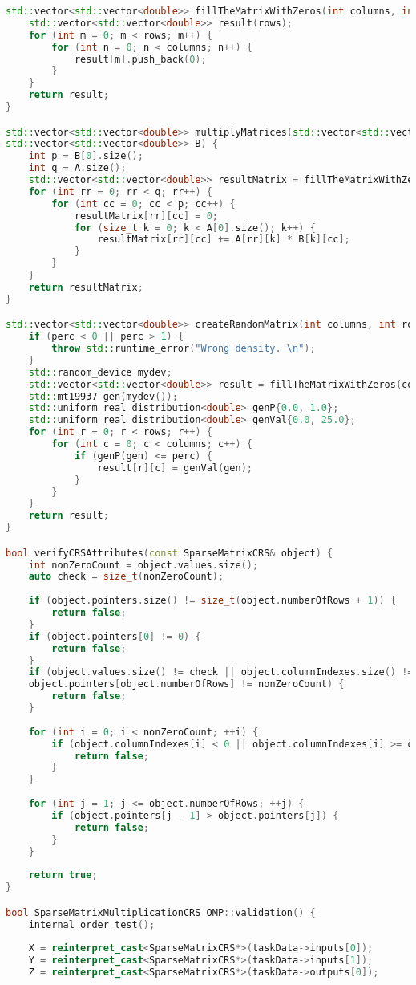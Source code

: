 \documentclass[a4paper, 14pt]{article}
\newcommand{\n}{\par}
\theoremstyle{plain}
\begin{document}
\begin{lstlisting}[language=C++,caption=Файл sparse\_matmult\_crs\_omp.cpp]
std::vector<std::vector<double>> fillTheMatrixWithZeros(int columns, int rows) {
	std::vector<std::vector<double>> result(rows);
	for (int m = 0; m < rows; m++) {
		for (int n = 0; n < columns; n++) {
			result[m].push_back(0);
		}
	}
	return result;
}

std::vector<std::vector<double>> multiplyMatrices(std::vector<std::vector<double>> A,
std::vector<std::vector<double>> B) {
	int p = B[0].size();
	int q = A.size();
	std::vector<std::vector<double>> resultMatrix = fillTheMatrixWithZeros(p, q);
	for (int rr = 0; rr < q; rr++) {
		for (int cc = 0; cc < p; cc++) {
			resultMatrix[rr][cc] = 0;
			for (size_t k = 0; k < A[0].size(); k++) {
				resultMatrix[rr][cc] += A[rr][k] * B[k][cc];
			}
		}
	}
	return resultMatrix;
}

std::vector<std::vector<double>> createRandomMatrix(int columns, int rows, double perc) {
	if (perc < 0 || perc > 1) {
		throw std::runtime_error("Wrong density. \n");
	}
	std::random_device mydev;
	std::vector<std::vector<double>> result = fillTheMatrixWithZeros(columns, rows);
	std::mt19937 gen(mydev());
	std::uniform_real_distribution<double> genP{0.0, 1.0};
	std::uniform_real_distribution<double> genVal{0.0, 25.0};
	for (int r = 0; r < rows; r++) {
		for (int c = 0; c < columns; c++) {
			if (genP(gen) <= perc) {
				result[r][c] = genVal(gen);
			}
		}
	}
	return result;
}

bool verifyCRSAttributes(const SparseMatrixCRS& object) {
	int nonZeroCount = object.values.size();
	auto check = size_t(nonZeroCount);
	
	if (object.pointers.size() != size_t(object.numberOfRows + 1)) {
		return false;
	}
	if (object.pointers[0] != 0) {
		return false;
	}
	if (object.values.size() != check || object.columnIndexes.size() != check ||
	object.pointers[object.numberOfRows] != nonZeroCount) {
		return false;
	}
	
	for (int i = 0; i < nonZeroCount; ++i) {
		if (object.columnIndexes[i] < 0 || object.columnIndexes[i] >= object.numberOfColumns) {
			return false;
		}
	}
	
	for (int j = 1; j <= object.numberOfRows; ++j) {
		if (object.pointers[j - 1] > object.pointers[j]) {
			return false;
		}
	}
	
	return true;
}

bool SparseMatrixMultiplicationCRS_OMP::validation() {
	internal_order_test();
	
	X = reinterpret_cast<SparseMatrixCRS*>(taskData->inputs[0]);
	Y = reinterpret_cast<SparseMatrixCRS*>(taskData->inputs[1]);
	Z = reinterpret_cast<SparseMatrixCRS*>(taskData->outputs[0]);
	

\end{lstlisting}
\end{document}
